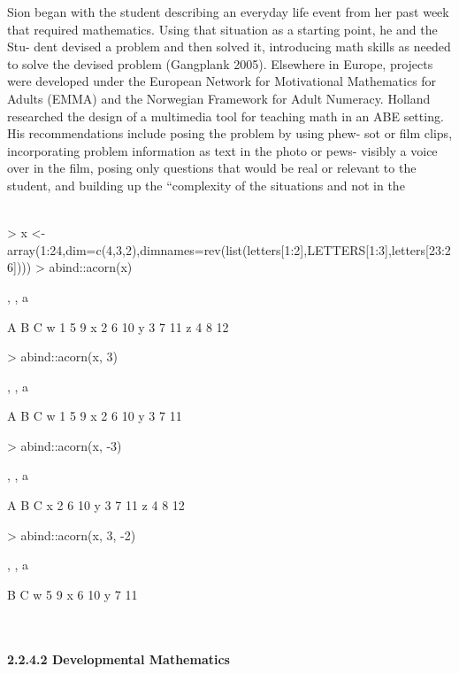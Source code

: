 \documentclass{article}
\begin{document}
   Sion began with the student describing an everyday life event from her past week
 that required mathematics. Using that situation as a starting point, he and the Stu-
   dent devised a problem and then solved it, introducing math skills as needed to
 solve the devised problem (Gangplank 2005). Elsewhere in Europe, projects were
 developed under the European Network for Motivational Mathematics for Adults
 (EMMA) and the Norwegian Framework for Adult Numeracy.
 Holland researched the design of a multimedia tool for teaching math in an
 ABE setting. His recommendations include posing the problem by using phew-
   sot or film clips, incorporating problem information as text in the photo or pews-
   visibly a voice over in the film, posing only questions that would be real or relevant
 to the student, and building up the “complexity of the situations and not in the
\textit{\\\\}
\begin{Schunk}
\begin{Sinput}
> x <- array(1:24,dim=c(4,3,2),dimnames=rev(list(letters[1:2],LETTERS[1:3],letters[23:26])))
> abind::acorn(x)
\end{Sinput}
\begin{Soutput}
, , a

  A B  C
w 1 5  9
x 2 6 10
y 3 7 11
z 4 8 12
\end{Soutput}
\begin{Sinput}
> abind::acorn(x, 3)
\end{Sinput}
\begin{Soutput}
, , a

  A B  C
w 1 5  9
x 2 6 10
y 3 7 11
\end{Soutput}
\begin{Sinput}
> abind::acorn(x, -3)
\end{Sinput}
\begin{Soutput}
, , a

  A B  C
x 2 6 10
y 3 7 11
z 4 8 12
\end{Soutput}
\begin{Sinput}
> abind::acorn(x, 3, -2)
\end{Sinput}
\begin{Soutput}
, , a

  B  C
w 5  9
x 6 10
y 7 11
\end{Soutput}
\end{Schunk}
\textit{\\\\}
\textbf{ 2.2.4.2 Developmental Mathematics }
\end{document}
